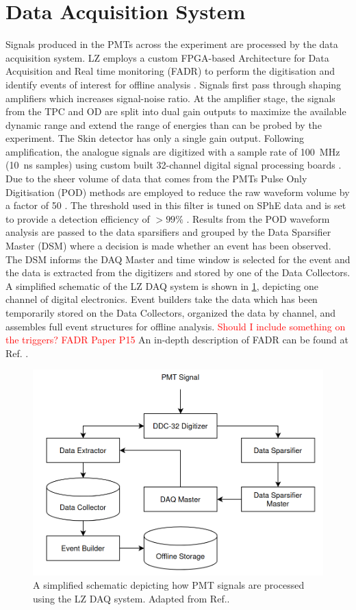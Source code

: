\section{Data Acquisition System}
Signals produced in the PMTs across the experiment are processed by the data acquisition system. LZ employs a custom FPGA-based Architecture for Data Acquisition and Real time monitoring (FADR) to perform the digitisation and identify events of interest for offline analysis \cite{LZ:2024bvw,Druszkiewicz:2015pcl}. 
Signals first pass through shaping amplifiers which increases signal-noise ratio. At the amplifier stage, the signals from the TPC and OD are split into dual gain outputs to maximize the available dynamic range and extend the range of energies than can be probed by the experiment. The Skin detector has only a single gain output. Following amplification, the analogue signals are digitized with a sample rate of 100~MHz (10~ns samples) using custom built 32-channel digital signal processing boards \cite{Druszkiewicz:2015pcl}. Due to the sheer volume of data that comes from the PMTs Pulse Only Digitisation (POD) methods are employed to reduce the raw waveform volume by a factor of 50 \cite{LZTDR}. The threshold used in this filter is tuned on SPhE data and is set to provide a detection efficiency of $>99\%$ \cite{LZ:2024bvw}. Results from the POD waveform analysis are passed to the data sparsifiers and grouped by the Data Sparsifier Master (DSM) where a decision is made whether an event has been observed. The DSM informs the DAQ Master and time window is selected for the event and the data is extracted from the digitizers and stored by one of the Data Collectors. A simplified schematic of the LZ DAQ system is shown in \ref{fig:LZDAQ}, depicting one channel of digital electronics. Event builders take the data which has been temporarily stored on the Data Collectors, organized the data by channel, and assembles full event structures for offline analysis. \textcolor{red}{Should I include something on the triggers? FADR Paper P15 \cite{LZ:2024bvw}} An in-depth description of FADR can be found at Ref. \cite{LZ:2024bvw}.
\begin{figure}[h!]
    \centering
    \includegraphics[width=\linewidth]{figures/LZ/LZDAQ.png}
    \caption{A simplified schematic depicting how PMT signals are processed using the LZ DAQ system. Adapted from Ref.\cite{LZ:2024bvw}.}
    \label{fig:LZDAQ}
\end{figure}
